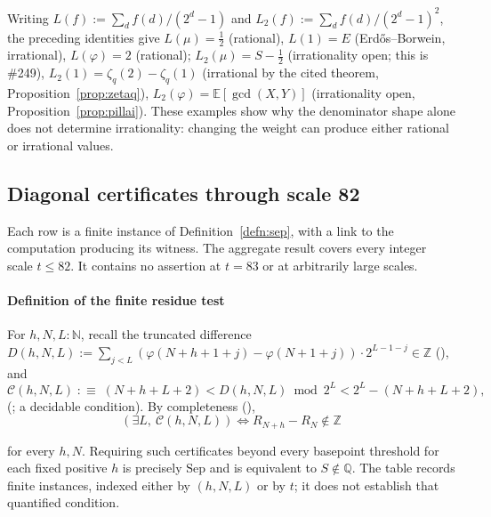 \begin{rem}
Writing $L(f):=\sum_d f(d)/(2^d-1)$ and
$L_2(f):=\sum_d f(d)/(2^d-1)^2$, the preceding identities give
$L(\mu)=\tfrac12$ (rational), $L(1)=E$ (Erd\H{o}s--Borwein,
irrational), $L(\varphi)=2$ (rational); $L_2(\mu)=S-\tfrac12$
(irrationality open; this is \#249), $L_2(1)=\zeta_q(2)-\zeta_q(1)$
(irrational by the cited theorem, Proposition~\ref{prop:zetaq}),
$L_2(\varphi)=\mathbb{E}[\gcd(X,Y)]$ (irrationality open,
Proposition~\ref{prop:pillai}). These examples show why the denominator shape alone does not determine
irrationality: changing the weight can produce either rational or
irrational values.
\end{rem}

\subsection{Diagonal certificates through scale 82}
\label{ssec:certtable}

Each row is a finite instance of Definition~\ref{defn:sep}, with a
link to the computation producing its witness. The aggregate result
covers every integer scale $t\le82$. It contains no assertion at
$t=83$ or at arbitrarily large scales.

\paragraph{Definition of the finite residue test} For $h,N,L : \mathbb{N}$, recall the truncated
difference $D(h,N,L) := \sum_{j<L} (\varphi(N+h+1+j)-\varphi(N+1+j))\cdot 2^{L-1-j} \in \mathbb{Z}$
(), and
\[
\mathcal{C}(h,N,L) \;:\equiv\; (N+h+L+2) < D(h,N,L) \bmod 2^{L} < 2^{L}-(N+h+L+2),
\]
(; a decidable condition). By
completeness (),
\[
(\exists L,\ \mathcal{C}(h,N,L)) \iff R_{N+h}-R_N \notin \mathbb{Z}
\]

for every $h,N$. Requiring such certificates beyond every basepoint
threshold for each fixed positive $h$ is precisely $\mathrm{Sep}$ and is
equivalent to $S\notin\mathbb Q$. The table records finite instances,
indexed either by $(h,N,L)$ or by $t$; it does not establish that quantified
condition.

